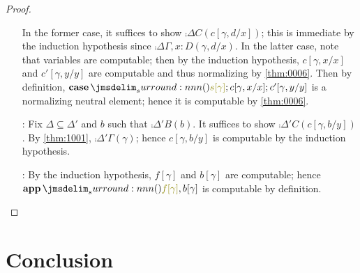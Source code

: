 \documentclass[a4paper]{article}
\begin{document}
\begin{proof}
\begin{itemize}
    In the former case, it suffices to show $\comp{\Delta}{C}(c[\gamma,d/x])$; this is immediate by the induction hypothesis since $\comp{\Delta}{\Gamma,x : D}(\gamma, d/x)$.
    In the latter case, note that variables are computable; then by the induction hypothesis, $c[\gamma,x/x]$ and $c'[\gamma,y/y]$ are computable and thus normalizing by \cref{thm:0006}.
    Then by definition, $\tmCase{s[\gamma]}{c[\gamma,x/x]}{c'[\gamma,y/y]}$ is a normalizing neutral element; hence it is computable by \cref{thm:0006}.
  \item[\rFunI:] Fix $\Delta \subseteq \Delta'$ and $b$ such that $\comp{\Delta'}{B}(b)$.
    It suffices to show $\comp{\Delta'}{C}(c[\gamma,b/y])$.
    By \cref{thm:1001}, $\comp{\Delta'}{\Gamma}(\gamma)$; hence $c[\gamma,b/y]$ is computable by the induction hypothesis.
  \item[\rFunE:] By the induction hypothesis, $f[\gamma]$ and $b[\gamma]$ are computable; hence $\tmApp{f[\gamma]}{b[\gamma]}$ is computable by definition.
  \end{itemize}
\end{proof}

\section{Conclusion}
\label{sec:0007}





\end{document}
